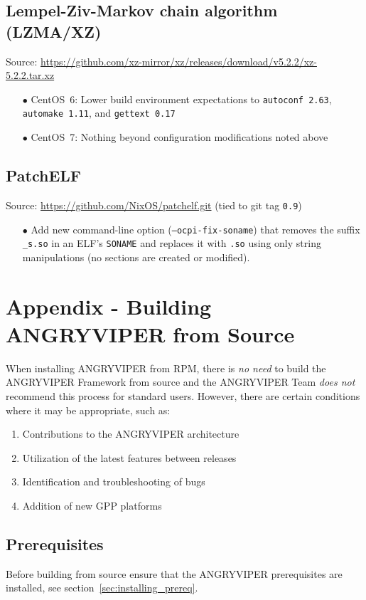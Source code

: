 \begin{appendices}
\subsection{Lempel-Ziv-Markov chain algorithm (LZMA/XZ)}
Source: \url{https://github.com/xz-mirror/xz/releases/download/v5.2.2/xz-5.2.2.tar.xz}
\label{App:xz}
\begin{enumerate}
\item[$\bullet$] CentOS~6: Lower build environment expectations to \texttt{autoconf 2.63}, \texttt{automake 1.11}, and \texttt{gettext 0.17}
\item[$\bullet$] CentOS~7: Nothing beyond configuration modifications noted above
\end{enumerate}


\subsection{PatchELF}
Source: \url{https://github.com/NixOS/patchelf.git} (tied to git tag \texttt{0.9})
\label{App:patchelf}
\begin{enumerate}
\item[$\bullet$] Add new command-line option (\texttt{--ocpi-fix-soname}) that removes the suffix \verb+_s.so+ in an ELF's \texttt{SONAME} and replaces it with \verb+.so+ using only string manipulations (no sections are created or modified).
\end{enumerate}

\newpage
\section{Appendix - Building ANGRYVIPER from Source}

\label{subsec:install_from_source}
When installing ANGRYVIPER from RPM, there is \textit{no need} to build the ANGRYVIPER Framework from source and the ANGRYVIPER Team \textit{does not} recommend this process for standard users. However, there are certain conditions where it may be appropriate, such as:
\begin{enumerate}
\item Contributions to the ANGRYVIPER architecture
\item Utilization of the latest features between releases
\item Identification and troubleshooting of bugs
\item Addition of new GPP platforms
\end{enumerate}

\subsection{Prerequisites}
Before building from source ensure that the ANGRYVIPER prerequisites are installed, see section~\ref{sec:installing_prereq}. \\


\end{appendices}
